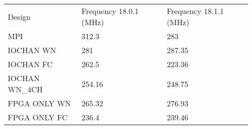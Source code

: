 \begin{table}[]
\begin{tabular}{lll}
Design         & Frequency 18.0.1 (MHz) & Frequency 18.1.1 (MHz) \\
MPI            & 312.3                  & 283                    \\
IOCHAN WN      & 281                    & 287.35                 \\
IOCHAN FC      & 262.5                  & 223.36                 \\
IOCHAN WN\_4CH & 254.16                 & 248.75                 \\
FPGA ONLY WN   & 265.32                 & 276.93                 \\
FPGA ONLY FC   & 236.4                  & 239.46
\end{tabular}
\end{table}